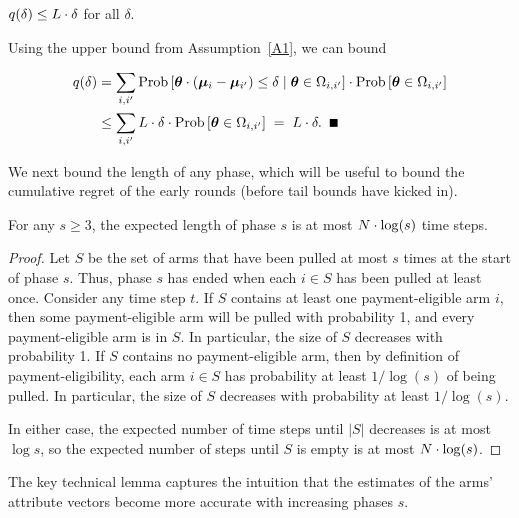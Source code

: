 \begin{lemma} \label{lem:sdelta}
$q(\delta) \leq L \cdot \delta$ for all $\delta$.
\end{lemma}

\begin{emptyproof}
Using the upper bound from Assumption~\ref{A1}, we can bound

\begin{align*}
\AlmostTied{\delta}
& = \sum_{i,i'} \ProbC{\AgV \cdot (\ArmV{i} - \ArmV{i'}) \leq \delta}%
    {\AgV \in \FirstTwo{i}{i'}}
  \cdot \Prob{\AgV \in \FirstTwo{i}{i'}}\\
& \leq \sum_{i,i'} \TieDensity \cdot \delta
    \cdot \Prob{\AgV \in \FirstTwo{i}{i'}}
\; = \; \TieDensity \cdot \delta. \QED
\end{align*}
\end{emptyproof}

We next bound the length of any phase, which will be useful to bound
the cumulative regret of the early rounds
(before tail bounds have kicked in).

\begin{lemma} \label{lem:phase-length}
For any $s\geq 3$, the expected length of phase $s$ is at most
$N \cdot \log(s)$ time steps.
\end{lemma}

\begin{proof}
Let $S$ be the set of arms that have been pulled at most
$s$ times at the start of phase $s$.
Thus, phase $s$ has ended when each $i \in S$ has been pulled at least once.
Consider any time step $t$.
If $S$ contains at least one payment-eligible arm $i$,
then some payment-eligible arm will be pulled with probability 1,
and every payment-eligible arm is in $S$.
In particular, the size of $S$ decreases with probability 1.
If $S$ contains no payment-eligible arm,
then by definition of payment-eligibility,
each arm $i \in S$ has probability at least $1/\log(s)$ of being pulled.
In particular, the size of $S$ decreases with probability at least $1/\log(s)$.

In either case, the expected number of time steps until
$|S|$ decreases is at most $\log s$,
so the expected number of steps until $S$ is empty is at most
$N \cdot \log(s)$.
\end{proof}
                  
The key technical lemma captures the intuition that
the estimates of the arms' attribute vectors become
more accurate with increasing phases $s$.

